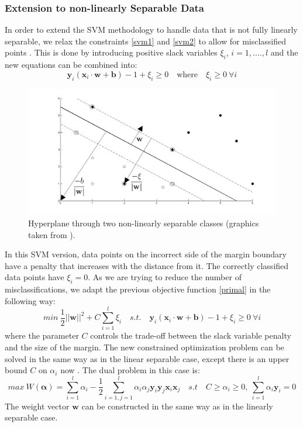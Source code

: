\documentclass[a4paper,11pt,oneside]{article}
\begin{document}
\subsubsection*{Extension to non-linearly Separable Data}
In order to extend the SVM methodology to handle data that is not fully linearly separable, we relax 
the constraints \ref{svm1} and \ref{svm2} to allow for misclassified points \cite{fletcher2009support}. This is done by introducing
positive slack variables $\xi_i$, $i=1,....,l$ and the new equations can be combined into:
\begin{equation}
  \mathbf{y}_i(\mathbf{x}_i\cdot\mathbf{w}+\mathbf{b}) - 1 + \xi_i\geq 0 \quad \text{where} \quad \xi_i\geq 0\ \forall i
\end{equation}
\begin{figure}[H]
  \includegraphics[scale=0.3]{nonlinear}
  \centering
  \caption{Hyperplane through two non-linearly separable classes (graphics taken from \cite{fletcher2009support}).}
\end{figure}
In this SVM version, data points on the incorrect side of the margin boundary have a penalty that increases with the distance
from it. The correctly classified data points have $\xi_i=0$. As we are trying to reduce the number of misclassifications,
we adapt the previous objective function \ref{primal} in the following way:
\begin{equation}
  min \ \frac{1}{2}||\mathbf{w}||^2+C\sum_{i=1}^l\xi_i\quad s.t. \quad \mathbf{y}_i(\mathbf{x}_i\cdot\mathbf{w}+\mathbf{b}) - 1 + \xi_i\geq 0 \ \forall i
\end{equation}
where the parameter $C$ controls the trade-off between the slack variable penalty and the size of the margin.
The new constrained optimization problem can be solved in the same way as in the linear separable case, except
there is an upper bound $C$ on $\alpha_i$ now \cite{law2006simple}. The dual problem in this case is:
\begin{equation}
  max \ W(\mathbf{\alpha}) = \sum_{i=1}^l \alpha_i - \frac{1}{2} \sum_{i=1,j=1}^l \alpha_i \alpha_j \mathbf{y}_i\mathbf{y}_j\mathbf{x}_i\mathbf{x}_j
  \quad s.t \quad C\geq\alpha_i \geq 0,\ \sum_{i=1}^l \alpha_i\mathbf{y}_i = 0
\end{equation}
The weight vector $\mathbf{w}$ can be constructed in the same way as in the linearly separable case.
\end{document}
